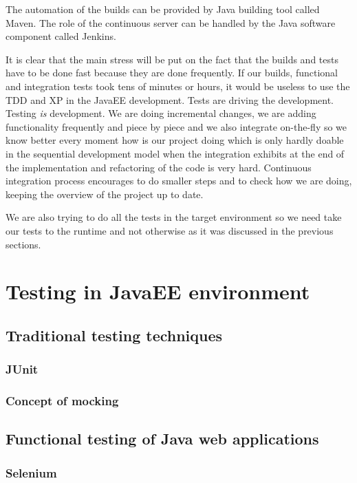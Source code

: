 \documentclass[12pt,final,oneside]{fithesis}
\begin{document}
The automation of the builds can be provided by Java building tool called Maven. The role of the continuous server can be handled by the Java software component called Jenkins.

It is clear that the main stress will be put on the fact that the builds and tests have to be done fast because they are done frequently. If our builds, functional and integration tests took tens of minutes or hours, it would be useless to use the TDD and XP in the JavaEE development. Tests are driving the development. Testing \emph{is} development. We are doing incremental changes, we are adding functionality frequently and piece by piece and we also integrate on-the-fly so we know better every moment how is our project doing which is only hardly doable in the sequential development model when the integration exhibits at the end of the implementation and refactoring of the code is very hard. Continuous integration process encourages to do smaller steps and to check how we are doing, keeping the overview of the project up to date.

We are also trying to do all the tests in the target environment so we need take our tests to the runtime and not otherwise as it was discussed in the previous sections.

\chapter{Testing in JavaEE environment}

	\section{Traditional testing techniques}
		\subsection{JUnit}
		
		\subsection{Concept of mocking}

	\section{Functional testing of Java web applications}
		\subsection{Selenium}
\end{document}
